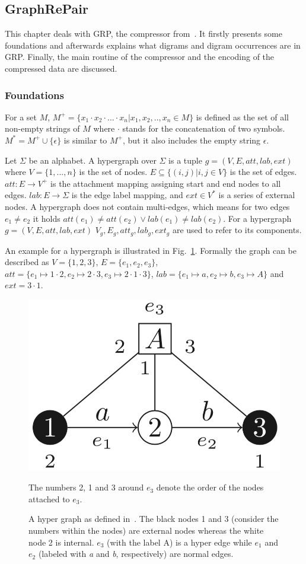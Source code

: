 \subsection{GraphRePair}\label{ch:GRP}

This chapter deals with GRP, the compressor from~\cite{maneth}. It firstly presents some foundations and afterwards explains what digrams and digram occurrences are in GRP. Finally, the main routine of the compressor and the encoding of the compressed data are discussed.

\subsubsection{Foundations}

For a set $M$, $M^+=\{x_1 \cdot x_2 \cdot ... \cdot x_n | x_1,x_2,..,x_n \in M \}$ is defined as the set of all non-empty strings of $M$ where $\cdot$ stands for the concatenation of two symbols.
$M^*=M^+ \cup \{ \epsilon \} $ is similar to $M^+$, but it also includes the empty string $\epsilon$.

Let $\Sigma$ be an alphabet. A hypergraph over $\Sigma$ is a tuple $g=(V,E,att,lab,ext)$ where $V=\{1,...,n\}$ is the set of nodes. $E \subseteq \{(i,j) | i,j\in V\} $ is the set of edges. $att: E \to V^+$ is the attachment mapping assigning start and end nodes to all edges. $lab: E\to \Sigma$ is the edge label mapping, and $ext \in V^*$ is a series of external nodes. A hypergraph does not contain multi-edges, which means for two edges $e_1\not=e_2$ it holds $att(e_1)\not=att(e_2) \vee lab(e_1)\not=lab(e_2)$. For a hypergraph $g=(V,E,att,lab,ext)$  $V_g, E_g, att_g, lab_g, ext_g$ are used to refer to its components.

An example for a hypergraph is illustrated in Fig.~\ref{fig:hypergraph}. Formally the graph can be described as $V=\{1,2,3\}$, $E=\{e_1,e_2,e_3\}$, $att=\{e_1 \mapsto 1 \cdot 2, e_2 \mapsto2 \cdot 3, e_3 \mapsto 2 \cdot 1 \cdot 3 \}$, $lab=\{ e_1\mapsto a, e_2 \mapsto b, e_3 \mapsto A \}$ and $ext=3 \cdot 1$.

\begin{figure}
	\centering
	\includegraphics[width=0.3\linewidth]{figures/relatedwork/hypergraph}
	\caption{A hyper graph as defined in~\cite{maneth}. The black nodes 1 and 3 (consider the numbers within the nodes) are external nodes whereas the white node 2 is internal. $e_3$ (with the label A) is a hyper edge while $e_1$ and $e_2$ (labeled with \textit{a} and \textit{b}, respectively) are normal edges.} The numbers 2, 1 and 3 around $e_3$ denote the order of the nodes attached to $e_3$.
	\label{fig:hypergraph}
\end{figure}

